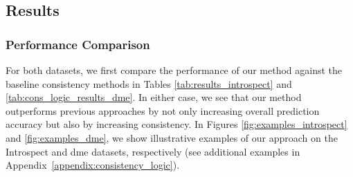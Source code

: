 \subsection{Results}
\label{sec:cons_logic_results}


\subsubsection{Performance Comparison}
For both datasets, we first compare the performance of our method against the baseline consistency methods in Tables \ref{tab:results_introspect} and \ref{tab:cons_logic_results_dme}. In either case, we see that our method outperforms previous approaches by not only increasing overall prediction accuracy but also by increasing consistency. In Figures \ref{fig:examples_introspect} and \ref{fig:examples_dme}, we show illustrative examples of our approach on the Introspect and \gls{dme} datasets, respectively (see additional examples in Appendix~\ref{appendix:consistency_logic}).



